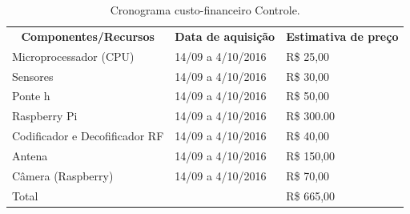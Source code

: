 \begin{table}[h]
 \centering
 {\renewcommand\arraystretch{1.25}
 \caption{Cronograma custo-financeiro Controle.}
 \begin{tabular}{ l l l }
  \cline{1-1}\cline{2-2}\cline{3-3}  
    \multicolumn{1}{|c|}{\textbf{Componentes/Recursos} \centering } &
    \multicolumn{1}{c|}{\textbf{Data de aquisição} \centering } &
    \multicolumn{1}{c|}{\textbf{Estimativa de preço} \centering }
  \\  
  \cline{1-1}\cline{2-2}\cline{3-3}  
    \multicolumn{1}{|p{3.850cm}|}{Microprocessador (CPU) \centering } &
    \multicolumn{1}{p{4.217cm}|}{14/09 a 4/10/2016 \centering } &
    \multicolumn{1}{p{4.217cm}|}{R\$ 25,00 \centering }
  \\  
  \cline{1-1}\cline{2-2}\cline{3-3}  
    \multicolumn{1}{|p{3.850cm}|}{Sensores \centering } &
    \multicolumn{1}{p{4.217cm}|}{14/09 a 4/10/2016 \centering } &
    \multicolumn{1}{p{4.217cm}|}{R\$ 30,00 \centering }
  \\  
  \cline{1-1}\cline{2-2}\cline{3-3}  
    \multicolumn{1}{|p{3.850cm}|}{Ponte h \centering } &
    \multicolumn{1}{p{4.217cm}|}{14/09 a 4/10/2016 \centering } &
    \multicolumn{1}{p{4.217cm}|}{R\$ 50,00 \centering }
  \\  
  \cline{1-1}\cline{2-2}\cline{3-3}  
    \multicolumn{1}{|p{3.850cm}|}{Raspberry Pi  \centering } &
    \multicolumn{1}{p{4.217cm}|}{14/09 a 4/10/2016 \centering } &
    \multicolumn{1}{p{4.217cm}|}{R\$ 300.00 \centering }
  \\  
  \cline{1-1}\cline{2-2}\cline{3-3}  
    \multicolumn{1}{|p{3.850cm}|}{Codificador e Decofificador RF \centering } &
    \multicolumn{1}{p{4.217cm}|}{14/09 a 4/10/2016 \centering } &
    \multicolumn{1}{p{4.217cm}|}{R\$ 40,00 \centering }
  \\  
  \cline{1-1}\cline{2-2}\cline{3-3}  
    \multicolumn{1}{|p{3.850cm}|}{Antena \centering } &
    \multicolumn{1}{p{4.217cm}|}{14/09 a 4/10/2016 \centering } &
    \multicolumn{1}{p{4.217cm}|}{R\$ 150,00 \centering }
  \\  
  \cline{1-1}\cline{2-2}\cline{3-3}  
    \multicolumn{1}{|p{3.850cm}|}{Câmera (Raspberry) \centering } &
    \multicolumn{1}{p{4.217cm}|}{14/09 a 4/10/2016 \centering } &
    \multicolumn{1}{p{4.217cm}|}{R\$ 70,00 \centering }
  \\  
  \cline{1-1}\cline{2-2}\cline{3-3}  
    \multicolumn{2}{|p{3.850cm}|}{Total \centering } &
    \multicolumn{1}{p{4.217cm}|}{R\$ 665,00 \centering }
  \\  
  \hline

 \end{tabular} }
\end{table}


